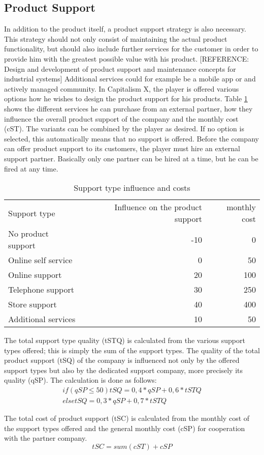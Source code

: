 \subsection{Product Support}
In addition to the product itself, a product support strategy is also necessary. This strategy should not only consist of maintaining the actual product functionality, but should also include further services for the customer in order to provide him with the greatest possible value with his product. [REFERENCE: Design and development of product support and maintenance concepts for industrial systems] Additional services could for example be a mobile app or and actively managed community.  
In Capitalism X, the player is offered various options how he wishes to design the product support for his products. Table \ref{Support_types} shows the different services he can purchase from an external partner, how they influence the overall product support of the company and the monthly cost (cST). The variants can be combined by the player as desired. If no option is selected, this automatically means that no support is offered.
Before the company can offer product support to its customers, the player must hire an external support partner. Basically only one partner can be hired at a time, but he can be fired at any time.

\begin{table}[ht]
    \centering
    \begin{tabular}{|l|r|r|}
    \hline
    Support type & Influence on the product support & monthly cost \\
    No product support   & -10   & 0    \\
    Online self service  & 0     & 50   \\
    Online support       & 20    & 100  \\
    Telephone support    & 30    & 250  \\
    Store support        & 40    & 400  \\
    Additional services  & 10    & 50   \\     
    \hline
    \end{tabular}
    \caption{Support type influence and costs}
    \label{Support_types}
\end{table}

The total support type quality (tSTQ) is calculated from the various support types offered; this is simply the sum of the support types. The quality of the total product support (tSQ) of the company is influenced not only by the offered support types but also by the dedicated support company, more precisely its quality (qSP). The calculation is done as follows:
\begin{equation}
\begin{aligned}
    if ( qSP ≤ 50 ) tSQ = { 0,4 *qSP + 0,6 * tSTQ } \\
    else tSQ = { 0,3 * qSP + 0,7 * tSTQ }
\end{aligned}
\end{equation}

The total cost of product support (tSC) is calculated from the monthly cost of the support types offered and the general monthly cost (cSP) for cooperation with the partner company.
\begin{equation}
    tSC = sum (cST) + cSP
\end{equation}